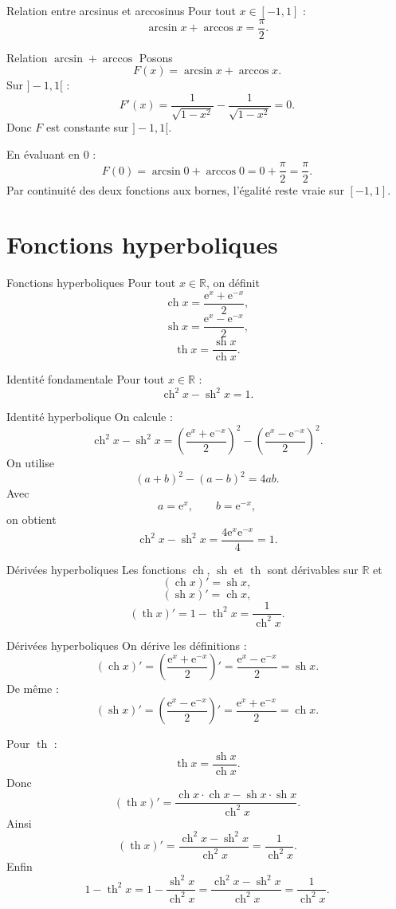 \documentclass[11pt,a4paper]{article}
\newcommand{\R}{\mathbb{R}}
\newcommand{\e}{\mathrm{e}}
\newcommand{\ch}{\operatorname{ch}}
\newcommand{\sh}{\operatorname{sh}}
\newcommand{\thh}{\operatorname{th}}
\begin{document}
\begin{theorembox}{Relation entre arcsinus et arccosinus}
Pour tout $x\in[-1,1]$ :
\[
\arcsin x+\arccos x=\frac\pi2.
\]
\end{theorembox}

\begin{proofbox}{Relation $\arcsin+\arccos$}
Posons
\[
F(x)=\arcsin x+\arccos x.
\]
Sur $]-1,1[$ :
\[
F'(x)=\frac1{\sqrt{1-x^2}}-\frac1{\sqrt{1-x^2}}=0.
\]
Donc $F$ est constante sur $]-1,1[$.

En évaluant en $0$ :
\[
F(0)=\arcsin 0+\arccos 0=0+\frac\pi2=\frac\pi2.
\]
Par continuité des deux fonctions aux bornes, l'égalité reste vraie sur $[-1,1]$.
\end{proofbox}

\section{Fonctions hyperboliques}

\begin{definitionbox}{Fonctions hyperboliques}
Pour tout $x\in\R$, on définit
\[
\ch x=\frac{\e^x+\e^{-x}}2,
\]
\[
\sh x=\frac{\e^x-\e^{-x}}2,
\]
\[
\thh x=\frac{\sh x}{\ch x}.
\]
\end{definitionbox}

\begin{theorembox}{Identité fondamentale}
Pour tout $x\in\R$ :
\[
\ch^2 x-\sh^2 x=1.
\]
\end{theorembox}

\begin{proofbox}{Identité hyperbolique}
On calcule :
\[
\ch^2 x-\sh^2 x
=
\left(\frac{\e^x+\e^{-x}}2\right)^2
-
\left(\frac{\e^x-\e^{-x}}2\right)^2.
\]
On utilise
\[
(a+b)^2-(a-b)^2=4ab.
\]
Avec
\[
a=\e^x,\qquad b=\e^{-x},
\]
on obtient
\[
\ch^2 x-\sh^2 x
=
\frac{4\e^x\e^{-x}}4
=
1.
\]
\end{proofbox}

\begin{theorembox}{Dérivées hyperboliques}
Les fonctions $\ch$, $\sh$ et $\thh$ sont dérivables sur $\R$ et
\[
(\ch x)'=\sh x,
\]
\[
(\sh x)'=\ch x,
\]
\[
(\thh x)'=1-\thh^2 x=\frac1{\ch^2 x}.
\]
\end{theorembox}

\begin{proofbox}{Dérivées hyperboliques}
On dérive les définitions :
\[
(\ch x)'
=
\left(\frac{\e^x+\e^{-x}}2\right)'
=
\frac{\e^x-\e^{-x}}2
=
\sh x.
\]
De même :
\[
(\sh x)'
=
\left(\frac{\e^x-\e^{-x}}2\right)'
=
\frac{\e^x+\e^{-x}}2
=
\ch x.
\]

Pour $\thh$ :
\[
\thh x=\frac{\sh x}{\ch x}.
\]
Donc
\[
(\thh x)'
=
\frac{\ch x\cdot \ch x-\sh x\cdot \sh x}{\ch^2 x}.
\]
Ainsi
\[
(\thh x)'=
\frac{\ch^2 x-\sh^2 x}{\ch^2 x}
=
\frac1{\ch^2 x}.
\]
Enfin
\[
1-\thh^2 x
=
1-\frac{\sh^2 x}{\ch^2 x}
=
\frac{\ch^2 x-\sh^2 x}{\ch^2 x}
=
\frac1{\ch^2 x}.
\]
\end{proofbox}
\end{document}
